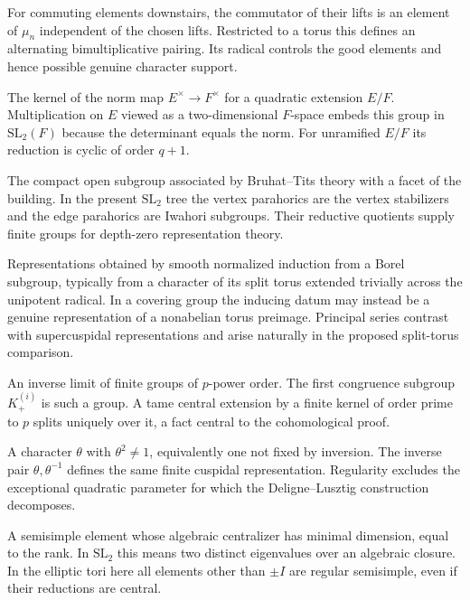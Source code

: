 \documentclass[12pt, letterpaper]{article}
\numberwithin{equation}{section}
\theoremstyle{definition}
\theoremstyle{remark}
\begin{document}
\begin{description}[style=nextline,leftmargin=1.5em,itemsep=5pt]
 \item[Metaplectic commutator pairing] For commuting elements downstairs, the commutator of their lifts is an element of $\mu_n$ independent of the chosen lifts. Restricted to a torus this defines an alternating bimultiplicative pairing. Its radical controls the good elements and hence possible genuine character support.
 \item[Norm-one torus] The kernel of the norm map $E^\times\to F^\times$ for a quadratic extension $E/F$. Multiplication on $E$ viewed as a two-dimensional $F$-space embeds this group in $\mathrm{SL}_2(F)$ because the determinant equals the norm. For unramified $E/F$ its reduction is cyclic of order $q+1$.
 \item[Parahoric subgroup] The compact open subgroup associated by Bruhat--Tits theory with a facet of the building. In the present $\mathrm{SL}_2$ tree the vertex parahorics are the vertex stabilizers and the edge parahorics are Iwahori subgroups. Their reductive quotients supply finite groups for depth-zero representation theory.
 \item[Principal series] Representations obtained by smooth normalized induction from a Borel subgroup, typically from a character of its split torus extended trivially across the unipotent radical. In a covering group the inducing datum may instead be a genuine representation of a nonabelian torus preimage. Principal series contrast with supercuspidal representations and arise naturally in the proposed split-torus comparison.
 \item[Pro-$p$ group] An inverse limit of finite groups of $p$-power order. The first congruence subgroup $K^{(i)}_+$ is such a group. A tame central extension by a finite kernel of order prime to $p$ splits uniquely over it, a fact central to the cohomological proof.
 \item[Regular character of the finite torus] A character $\theta$ with $\theta^2\ne1$, equivalently one not fixed by inversion. The inverse pair $\theta,\theta^{-1}$ defines the same finite cuspidal representation. Regularity excludes the exceptional quadratic parameter for which the Deligne--Lusztig construction decomposes.
 \item[Regular semisimple element] A semisimple element whose algebraic centralizer has minimal dimension, equal to the rank. In $\mathrm{SL}_2$ this means two distinct eigenvalues over an algebraic closure. In the elliptic tori here all elements other than $\pm I$ are regular semisimple, even if their reductions are central.

\end{description}
\end{document}
